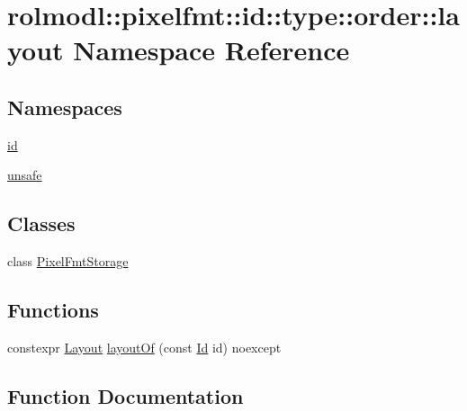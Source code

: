 \hypertarget{namespacerolmodl_1_1pixelfmt_1_1id_1_1type_1_1order_1_1layout}{}\section{rolmodl\+::pixelfmt\+::id\+::type\+::order\+::layout Namespace Reference}
\label{namespacerolmodl_1_1pixelfmt_1_1id_1_1type_1_1order_1_1layout}
\subsection*{Namespaces}
\begin{DoxyCompactItemize}
\item 
 \mbox{\hyperlink{namespacerolmodl_1_1pixelfmt_1_1id_1_1type_1_1order_1_1layout_1_1id}{id}}
\item 
 \mbox{\hyperlink{namespacerolmodl_1_1pixelfmt_1_1id_1_1type_1_1order_1_1layout_1_1unsafe}{unsafe}}
\end{DoxyCompactItemize}
\subsection*{Classes}
\begin{DoxyCompactItemize}
\item 
class \mbox{\hyperlink{classrolmodl_1_1pixelfmt_1_1id_1_1type_1_1order_1_1layout_1_1_pixel_fmt_storage}{Pixel\+Fmt\+Storage}}
\end{DoxyCompactItemize}
\subsection*{Functions}
\begin{DoxyCompactItemize}
\item 
constexpr \mbox{\hyperlink{namespacerolmodl_1_1pixelfmt_1_1id_1_1type_1_1order_a4177275b82f1923d1a2f07e1f87f0391}{Layout}} \mbox{\hyperlink{namespacerolmodl_1_1pixelfmt_1_1id_1_1type_1_1order_1_1layout_ae5a9f8fddaf780f11ef131d448dd34ba}{layout\+Of}} (const \mbox{\hyperlink{namespacerolmodl_1_1pixelfmt_a96282713e4465ba9211c8fd3a702b52b}{Id}} id) noexcept
\end{DoxyCompactItemize}


\subsection{Function Documentation}
\mbox{\label{namespacerolmodl_1_1pixelfmt_1_1id_1_1type_1_1order_1_1layout_ae5a9f8fddaf780f11ef131d448dd34ba}} 
